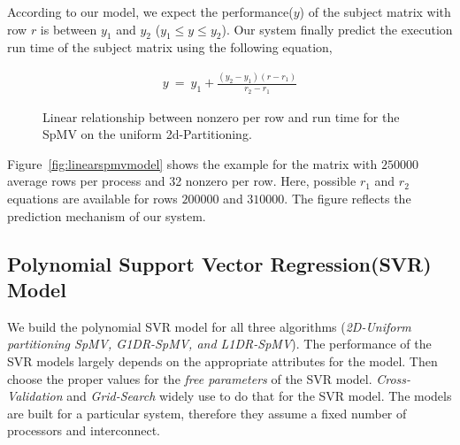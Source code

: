 \documentclass[sigconf,review,anonymous]{acmart}
\begin{document}
According to our model, we expect the performance($y$) of the subject
matrix with row $r$ is between $y_1$ and $y_2$ ($y_1\leq y\leq
y_2$). Our system finally predict the execution run time of the
subject matrix using the following equation,

\begin{equation*}
\begin{array}{l}
y\ =\ y_1+\frac{(y_2-y_1) (r-r_1)}{r_2-r_1}
\end{array}
\end{equation*}
\begin{figure}[hbt!]
\centering
{}
\caption{Linear relationship between nonzero per row and run time for the SpMV on the uniform 2d-Partitioning.}
\label{fig:ov-linear-model}
\end{figure}
Figure~\ref{fig:linearspmvmodel} shows the example for the matrix with $250000$ average rows per process and 32 nonzero per row. 
Here, possible $r_1$ and $r_2$ equations are available for rows $200000$ and $310000$. The figure reflects the prediction mechanism of our 
system. 


\subsection{Polynomial Support Vector Regression(SVR) Model}
\label{sec:svr-spmv}
We build the polynomial SVR model for all three algorithms
(\textit{2D-Uniform partitioning SpMV, G1DR-SpMV, and L1DR-SpMV}). The
performance of the SVR models largely depends on the appropriate
attributes for the model. Then choose the proper values for the
\textit{free parameters} of the SVR model.  \textit{Cross-Validation}
and \textit{Grid-Search} widely use to do that for the SVR model. The
models are built for a particular system, therefore they assume a
fixed number of processors and interconnect.
\end{document}
